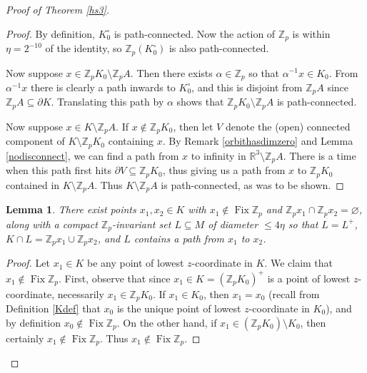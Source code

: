 \documentclass[12pt]{article}
\theoremstyle{plain}
\newtheorem{lemma}[theorem]{Lemma}
\theoremstyle{definition}
\theoremstyle{remark}
\numberwithin{equation}{section}
\begin{document}
\begin{proof}[Proof of Theorem \ref{hs3}]
\begin{proof}
By definition, $K_0^\circ$ is path-connected.  Now the action of $\mathbb Z_p$ is within $\eta=2^{-10}$ of the identity, so $\mathbb Z_p(K_0^\circ)$ is also path-connected.

Now suppose $x\in\mathbb Z_pK_0\setminus\mathbb Z_pA$.  Then there exists $\alpha\in\mathbb Z_p$ so that $\alpha^{-1}x\in K_0$.  From $\alpha^{-1}x$ there is clearly a path inwards to $K_0^\circ$, and this is disjoint from $\mathbb Z_pA$ since $\mathbb Z_pA\subseteq\partial K$.  Translating this path by $\alpha$ shows that $\mathbb Z_pK_0\setminus\mathbb Z_pA$ is path-connected.

Now suppose $x\in K\setminus\mathbb Z_pA$.  If $x\notin\mathbb Z_pK_0$, then let $V$ denote the (open) connected component of $K\setminus\mathbb Z_pK_0$ containing $x$.  By Remark \ref{orbithasdimzero} and Lemma \ref{nodisconnect}, we can find a path from $x$ to infinity in $\mathbb R^3\setminus\mathbb Z_pA$.  There is a time when this path first hits $\partial V\subseteq\mathbb Z_pK_0$, thus giving us a path from $x$ to $\mathbb Z_pK_0$ contained in $K\setminus\mathbb Z_pA$.  Thus $K\setminus\mathbb Z_pA$ is path-connected, as was to be shown.
\end{proof}

\begin{lemma}\label{constructL}
There exist points $x_1,x_2\in K$ with $x_1\notin\operatorname{Fix}\mathbb Z_p$ and $\mathbb Z_px_1\cap\mathbb Z_px_2=\varnothing$, along with a compact $\mathbb Z_p$-invariant set $L\subseteq M$ of diameter $\leq 4\eta$ so that $L=L^+$, $K\cap L=\mathbb Z_px_1\cup\mathbb Z_px_2$, and $L$ contains a path from $x_1$ to $x_2$.
\end{lemma}

\begin{proof}
Let $x_1\in K$ be any point of lowest $z$-coordinate in $K$.  We claim that $x_1\notin\operatorname{Fix}\mathbb Z_p$.  First, observe that since $x_1\in K=(\mathbb Z_pK_0)^+$ is a point of lowest $z$-coordinate, necessarily $x_1\in\mathbb Z_pK_0$.  If $x_1\in K_0$, then $x_1=x_0$ (recall from Definition \ref{Kdef} that $x_0$ is the unique point of lowest $z$-coordinate in $K_0$), and by definition $x_0\notin\operatorname{Fix}\mathbb Z_p$.  On the other hand, if $x_1\in(\mathbb Z_pK_0)\setminus K_0$, then certainly $x_1\notin\operatorname{Fix}\mathbb Z_p$.  Thus $x_1\notin\operatorname{Fix}\mathbb Z_p$.


\end{proof}
\end{proof}
\end{document}

